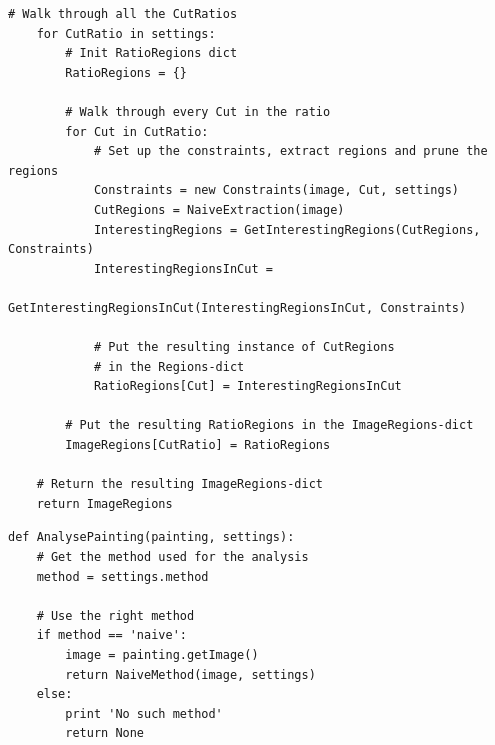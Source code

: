 {\begin{lstlisting}[caption={Pseudokode for den naive metode},
    captionpos=b, label={pseudo_naiveMethod}, frame=tb,
    breaklines=false, float=h]
    # Walk through all the CutRatios
    for CutRatio in settings:
        # Init RatioRegions dict
        RatioRegions = {}

        # Walk through every Cut in the ratio
        for Cut in CutRatio:
            # Set up the constraints, extract regions and prune the regions
            Constraints = new Constraints(image, Cut, settings)
            CutRegions = NaiveExtraction(image)
            InterestingRegions = GetInterestingRegions(CutRegions, Constraints)
            InterestingRegionsInCut =
                    GetInterestingRegionsInCut(InterestingRegionsInCut, Constraints)

            # Put the resulting instance of CutRegions
            # in the Regions-dict
            RatioRegions[Cut] = InterestingRegionsInCut

        # Put the resulting RatioRegions in the ImageRegions-dict
        ImageRegions[CutRatio] = RatioRegions

    # Return the resulting ImageRegions-dict
    return ImageRegions
\end{lstlisting}

\begin{lstlisting}[caption={Pseudokode til analyse af malerier efter
    metode}, captionpos=b, label={pseudo_naiveMethod}, frame=tb,
    breaklines=false, float=h]
def AnalysePainting(painting, settings):
    # Get the method used for the analysis
    method = settings.method

    # Use the right method
    if method == 'naive':
        image = painting.getImage()
        return NaiveMethod(image, settings)
    else:
        print 'No such method'
        return None
\end{lstlisting}

}
